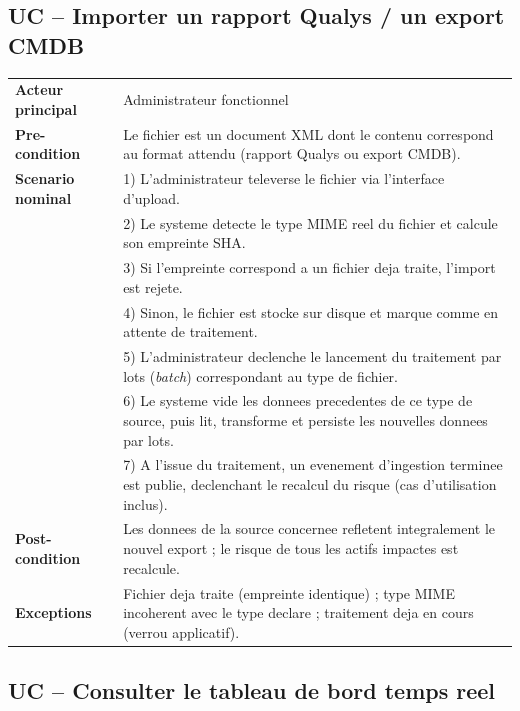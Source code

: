 \subsection{UC -- Importer un rapport Qualys / un export CMDB}

\begin{longtable}{@{}p{3.2cm}p{9.6cm}@{}}
\toprule
\textbf{Acteur principal} & Administrateur fonctionnel \\
\textbf{Pre-condition} & Le fichier est un document XML dont le contenu correspond au
format attendu (rapport Qualys ou export CMDB). \\
\textbf{Scenario nominal} &
1) L'administrateur televerse le fichier via l'interface d'upload. \\
& 2) Le systeme detecte le type MIME reel du fichier et calcule son empreinte
SHA. \\
& 3) Si l'empreinte correspond a un fichier deja traite, l'import est rejete. \\
& 4) Sinon, le fichier est stocke sur disque et marque comme en attente de
traitement. \\
& 5) L'administrateur declenche le lancement du traitement par lots
(\emph{batch}) correspondant au type de fichier. \\
& 6) Le systeme vide les donnees precedentes de ce type de source, puis lit,
transforme et persiste les nouvelles donnees par lots. \\
& 7) A l'issue du traitement, un evenement d'ingestion terminee est publie,
declenchant le recalcul du risque (cas d'utilisation inclus). \\
\textbf{Post-condition} & Les donnees de la source concernee refletent
integralement le nouvel export ; le risque de tous les actifs impactes est
recalcule. \\
\textbf{Exceptions} & Fichier deja traite (empreinte identique) ; type MIME
incoherent avec le type declare ; traitement deja en cours (verrou applicatif). \\
\bottomrule
\end{longtable}

\subsection{UC -- Consulter le tableau de bord temps reel}

